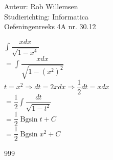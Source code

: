 \documentclass[a4paper]{article}
\newcommand{\dint}{\displaystyle\int}
\newcommand{\Bgsin}{\operatorname{Bgsin}}
\begin{document}
\noindent \large Auteur: Rob Willemsen \\
\noindent \large Studierichting: Informatica \\
\noindent \large Oefeningenreeks 4A nr. 30.12 \\

\medskip

\normalsize

$\dint \dfrac{xdx}{\sqrt{1-x^4}}$ \\

$= \dint \dfrac{xdx}{\sqrt{1-(x^2)^2}}$ \\

$t = x^2 \Rightarrow dt = 2x dx \Rightarrow \dfrac{1}{2}dt = x dx$ \\

$= \dfrac{1}{2} \dint \dfrac{dt}{\sqrt{1-t^2}}$ \\

$= \dfrac{1}{2} \Bgsin t + C$ \\

$= \dfrac{1}{2} \Bgsin x^2 + C$ \\

\begin{thebibliography}{999}
\end{thebibliography}
\end{document}
